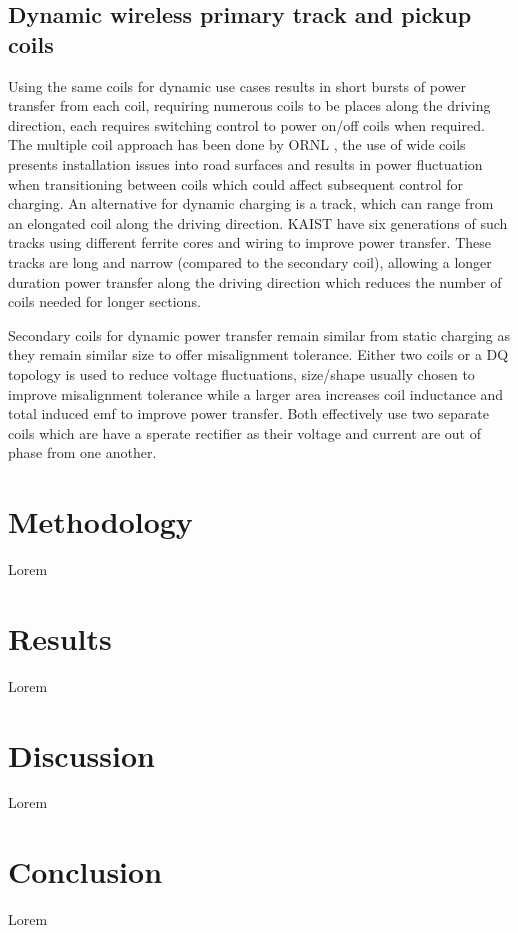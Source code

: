 \documentclass[conference]{IEEEtran}
\begin{document}
\subsection{Dynamic wireless primary track and pickup coils}
Using the same coils for dynamic use cases results in short bursts of power transfer from each coil, requiring numerous coils to be places along the driving direction, each requires switching control to power on/off coils when required. The multiple coil approach has been done by ORNL \cite{dwc_coils1}, the use of wide coils presents installation issues into road surfaces and results in power fluctuation when transitioning between coils which could affect subsequent control for charging.
An alternative for dynamic charging  is a track, which can range from an elongated coil along the driving direction. KAIST have six generations of such tracks \cite{dwc_coils2,dwc_coils3} using different ferrite cores and wiring to improve power transfer. These tracks are long and narrow (compared to the secondary coil), allowing a longer duration power transfer along the driving direction which reduces the number of coils needed for longer sections.

Secondary coils for dynamic power transfer remain similar from static charging as they remain similar size to offer misalignment tolerance. Either two coils \cite{dwc_coils4,dwc_coils5} or a DQ \cite{dwc_coils6} topology is used to reduce voltage fluctuations, size/shape usually chosen to improve misalignment tolerance while a larger area increases coil inductance and total induced emf to improve power transfer. Both effectively use two separate coils which are have a sperate rectifier as their voltage and current are out of phase from one another.

\section{Methodology}
Lorem

\section{Results}
Lorem

\section{Discussion}
Lorem

\section{Conclusion}
Lorem



\end{document}
